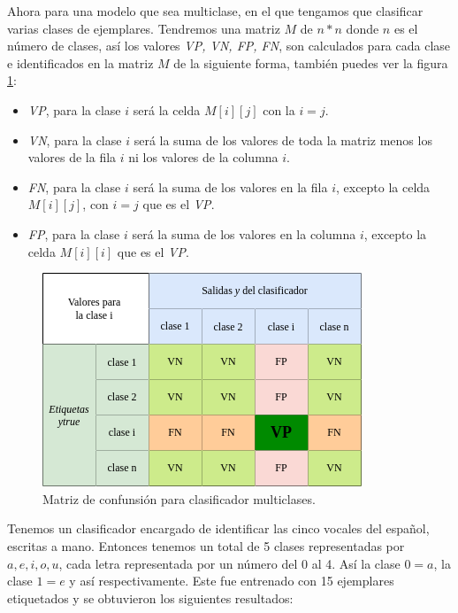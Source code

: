 \begin{description}
\begin{example}
\label{ej:binario}
\end{example}
 
 
 Ahora para una modelo que sea multiclase, en el que tengamos que clasificar varias clases de ejemplares. Tendremos una matriz $M$ de $n * n$ donde $n$ es el número de clases, así los valores \emph{VP, VN, FP, FN}, son calculados para cada clase e identificados en la matriz $M$ de la siguiente forma, también puedes ver la figura \ref{fig:mcMult}:
 \begin{itemize}
  \item \emph{VP}, para la clase $i$ será la celda $M[i][j]$ con la $i = j$.
  
  \item \emph{VN}, para la clase $i$ será la suma de los valores de toda la matriz menos los valores de la fila $i$ ni los valores de la columna $i$. 
  
  \item \emph{FN}, para la clase $i$ será la suma de los valores en la fila $i$, excepto la celda $M[i][j]$, con $i=j$ que es el \emph{VP}.
  
  \item \emph{FP}, para la clase $i$ será la suma de los valores en la columna $i$, excepto la celda $M[i][i]$ que es el \emph{VP}.
 
 \end{itemize}
 
  \begin{figure}[H]
 \centering
 \includegraphics[scale=0.7]{../Figuras/MC_multiple.png}
 \caption{Matriz de confunsión para clasificador multiclases.}
 \label{fig:mcMult} 
\end{figure}

 
 \begin{example}
Tenemos un clasificador encargado de identificar las cinco vocales del español, escritas a mano. Entonces tenemos un total de 5 clases representadas por $a, e, i, o, u$, cada letra representada por un número del 0 al 4. Así la clase $0 = a$, la clase $1 = e$ y así respectivamente. Este fue entrenado con 15 ejemplares etiquetados y se obtuvieron los siguientes resultados:



\end{example}
\end{description}
